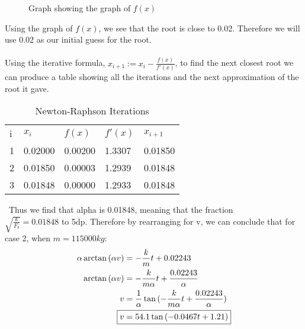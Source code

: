 \begin{figure}[H]
\centering

\caption{Graph showing the graph of $f(x)$}
\end{figure}

Using the graph of $f(x)$, we see that the root is close to 0.02. Therefore we will use 0.02 as our initial guess for the root.
\\ \\
Using the iterative formula, $x_{i+1} := x_{i}-\frac{f(x)}{f'(x)}$, to find the next closest root we can produce a table showing all the iterations and the next approximation of the root it gave.

\begin{table}[h]
\centering
    \begin{tabular}{|l|l|l|l|l|}
        \hline
        i & $x_i$ & $f(x)$ & $f'(x)$ & $x_{i+1}$ \\ \cline{1-5}
        1 & 0.02000 & 0.00200 & 1.3307 & 0.01850 \\ \cline{1-5}
        2 & 0.01850 & 0.00003 & 1.2939 & 0.01848 \\ \cline{1-5}
        3 & 0.01848 & 0.00000 & 1.2933 & 0.01848 \\ \cline{1-5}
    \end{tabular}
    \caption{Newton-Raphson Iterations}
\end{table}
\
Thus we find that alpha is 0.01848, meaning that the fraction \\ $\sqrt{\frac{k}{F_b}} = 0.01848$ to 5dp.
\newline \newline
Therefore by rearranging for v, we can conclude that for case 2, when $m=115000kg$:
\begin{align*}
    \alpha \arctan{(\alpha v)} &= -\frac{k}{m}t + 0.02243
    \\ \arctan{(\alpha v)} &= -\frac{k}{m\alpha}t + \frac{0.02243}{\alpha}
    \\ v &= \frac{1}{\alpha} \tan{(-\frac{k}{m\alpha}t + \frac{0.02243}{\alpha})}
    \\ \Aboxed{v &=  54.1\tan{(-0.0467t + 1.21)}}
\end{align*}
